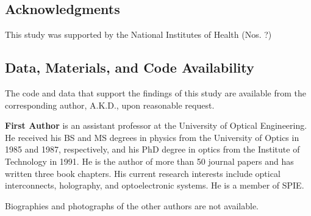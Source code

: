 \documentclass[12pt]{spieman}
\begin{document}
\begin{spacing}{2}
\subsection*{Acknowledgments}
This study was supported by the National Institutes of Health (Nos. ?)

\subsection* {Data, Materials, and Code Availability} 
The code and data that support the findings of this study are available from the corresponding author, A.K.D., upon reasonable request.






\vspace{1ex}
\vspace{2ex}\noindent\textbf{First Author} is an assistant professor at the University of Optical Engineering. He received his BS and MS degrees in physics from the University of Optics in 1985 and 1987, respectively, and his PhD degree in optics from the Institute of Technology in 1991.  He is the author of more than 50 journal papers and has written three book chapters. His current research interests include optical interconnects, holography, and optoelectronic systems. He is a member of SPIE.

\vspace{1ex}
\noindent Biographies and photographs of the other authors are not available.


\listoffigures
\listoftables


\end{spacing}
\end{document}
